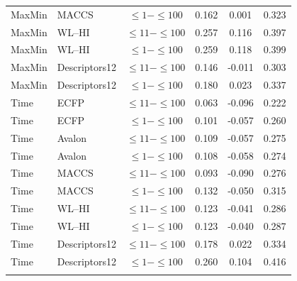 \begin{longtable}{llcccc}
MaxMin & MACCS & $\leq1-\leq100$ & 0.162 & 0.001 & 0.323 \\
MaxMin & WL--HI & $\leq11-\leq100$ & 0.257 & 0.116 & 0.397 \\
MaxMin & WL--HI & $\leq1-\leq100$ & 0.259 & 0.118 & 0.399 \\
MaxMin & Descriptors12 & $\leq11-\leq100$ & 0.146 & -0.011 & 0.303 \\
MaxMin & Descriptors12 & $\leq1-\leq100$ & 0.180 & 0.023 & 0.337 \\
\addlinespace
Time & ECFP & $\leq11-\leq100$ & 0.063 & -0.096 & 0.222 \\
Time & ECFP & $\leq1-\leq100$ & 0.101 & -0.057 & 0.260 \\
Time & Avalon & $\leq11-\leq100$ & 0.109 & -0.057 & 0.275 \\
Time & Avalon & $\leq1-\leq100$ & 0.108 & -0.058 & 0.274 \\
Time & MACCS & $\leq11-\leq100$ & 0.093 & -0.090 & 0.276 \\
Time & MACCS & $\leq1-\leq100$ & 0.132 & -0.050 & 0.315 \\
Time & WL--HI & $\leq11-\leq100$ & 0.123 & -0.041 & 0.286 \\
Time & WL--HI & $\leq1-\leq100$ & 0.123 & -0.040 & 0.287 \\
Time & Descriptors12 & $\leq11-\leq100$ & 0.178 & 0.022 & 0.334 \\
Time & Descriptors12 & $\leq1-\leq100$ & 0.260 & 0.104 & 0.416 \\
\addlinespace
\end{longtable}
